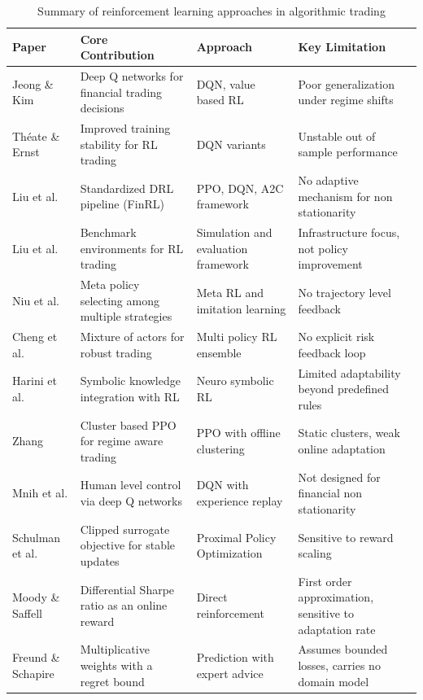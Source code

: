 \documentclass[conference]{IEEEtran}
\begin{document}
\begin{table}[t]
\caption{Summary of reinforcement learning approaches in algorithmic trading}
\label{tab:litreview}
\centering
\begin{tabular}{p{2.3cm}p{4.3cm}p{2.8cm}p{4.5cm}}
\toprule
\textbf{Paper} & \textbf{Core Contribution} & \textbf{Approach} & \textbf{Key Limitation} \\
\midrule
Jeong \& Kim \cite{jeong2019dqn} & Deep Q networks for financial trading decisions & DQN, value based RL & Poor generalization under regime shifts \\
Th\'eate \& Ernst \cite{theate2021drl} & Improved training stability for RL trading & DQN variants & Unstable out of sample performance \\
Liu et al. \cite{liu2020finrl} & Standardized DRL pipeline (FinRL) & PPO, DQN, A2C framework & No adaptive mechanism for non stationarity \\
Liu et al. \cite{liu2022finrlmeta} & Benchmark environments for RL trading & Simulation and evaluation framework & Infrastructure focus, not policy improvement \\
Niu et al. \cite{niu2022metatrader} & Meta policy selecting among multiple strategies & Meta RL and imitation learning & No trajectory level feedback \\
Cheng et al. \cite{cheng2024mot} & Mixture of actors for robust trading & Multi policy RL ensemble & No explicit risk feedback loop \\
Harini et al. \cite{harini2023neurosymbolic} & Symbolic knowledge integration with RL & Neuro symbolic RL & Limited adaptability beyond predefined rules \\
Zhang \cite{zhang2026cluster} & Cluster based PPO for regime aware trading & PPO with offline clustering & Static clusters, weak online adaptation \\
Mnih et al. \cite{mnih2015dqn} & Human level control via deep Q networks & DQN with experience replay & Not designed for financial non stationarity \\
Schulman et al. \cite{schulman2017ppo} & Clipped surrogate objective for stable updates & Proximal Policy Optimization & Sensitive to reward scaling \\
Moody \& Saffell \cite{moody2001learning} & Differential Sharpe ratio as an online reward & Direct reinforcement & First order approximation, sensitive to adaptation rate \\
Freund \& Schapire \cite{freund1997decision} & Multiplicative weights with a regret bound & Prediction with expert advice & Assumes bounded losses, carries no domain model \\

\end{tabular}
\end{table}
\end{document}
